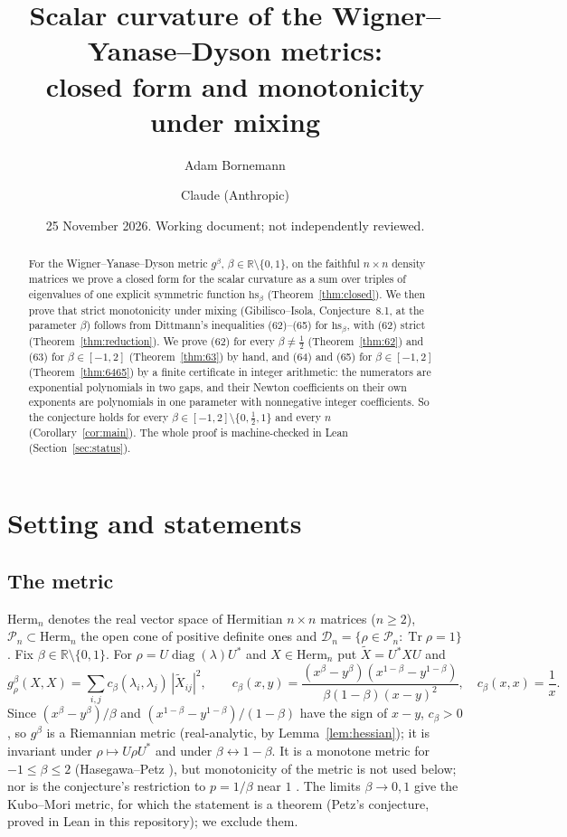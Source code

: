 \documentclass[11pt]{amsart}
\title[The WYD curvature conjecture]{Scalar curvature of the Wigner--Yanase--Dyson metrics:\\ closed form and monotonicity under mixing}
\author{Adam Bornemann}
\author{Claude (Anthropic)}
\date{25 November 2026. Working document; not independently reviewed.}
\theoremstyle{definition}
\numberwithin{equation}{section}
\newcommand{\R}{\mathbb{R}}
\newcommand{\Herm}{\mathrm{Herm}_n}
\newcommand{\Pn}{\mathcal{P}_n}
\newcommand{\Dn}{\mathcal{D}_n}
\newcommand{\Tr}{\operatorname{Tr}}
\newcommand{\hs}{\mathrm{hs}}
\begin{document}
\begin{abstract}
For the Wigner--Yanase--Dyson metric $g^\beta$, $\beta\in\R\setminus\{0,1\}$, on the faithful $n\times n$ density
matrices we prove a closed form for the scalar curvature as a sum over triples of eigenvalues of one explicit symmetric
function $\hs_\beta$ (Theorem~\ref{thm:closed}). We then prove that strict monotonicity under mixing
(Gibilisco--Isola, Conjecture~8.1, at the parameter $\beta$) follows from Dittmann's inequalities (62)--(65) for
$\hs_\beta$, with (62) strict (Theorem~\ref{thm:reduction}). We prove (62) for every $\beta\ne\frac12$ (Theorem~\ref{thm:62}) and (63) for $\beta\in[-1,2]$
(Theorem~\ref{thm:63}) by hand, and (64) and (65) for $\beta\in[-1,2]$ (Theorem~\ref{thm:6465}) by a finite certificate in integer arithmetic: the numerators are exponential polynomials in two gaps, and their
Newton coefficients on their own exponents are polynomials in one parameter with nonnegative integer coefficients. So the conjecture holds for every $\beta\in[-1,2]\setminus\{0,\frac12,1\}$ and every $n$
(Corollary~\ref{cor:main}). The whole proof is machine-checked in Lean (Section~\ref{sec:status}).
\end{abstract}

\maketitle

\section{Setting and statements}

\subsection*{The metric} $\Herm$ denotes the real vector space of Hermitian $n\times n$ matrices ($n\ge 2$), $\Pn\subset\Herm$ the
open cone of positive definite ones and $\Dn=\{\rho\in\Pn:\Tr\rho=1\}$. Fix $\beta\in\R\setminus\{0,1\}$. For $\rho=U\operatorname{diag}(\lambda)U^*$
and $X\in\Herm$ put $\tilde X=U^*XU$ and
\begin{equation}\label{eq:metric}
g^\beta_\rho(X,X)=\sum_{i,j}c_\beta(\lambda_i,\lambda_j)\,|\tilde X_{ij}|^2,\qquad
c_\beta(x,y)=\frac{(x^\beta-y^\beta)(x^{1-\beta}-y^{1-\beta})}{\beta(1-\beta)(x-y)^2},\quad c_\beta(x,x)=\frac1x .
\end{equation}
Since $(x^\beta-y^\beta)/\beta$ and $(x^{1-\beta}-y^{1-\beta})/(1-\beta)$ have the sign of $x-y$, $c_\beta>0$, so $g^\beta$ is a Riemannian
metric (real-analytic, by Lemma~\ref{lem:hessian}); it is invariant under $\rho\mapsto U\rho U^*$ and under $\beta\leftrightarrow1-\beta$.
It is a monotone metric for $-1\le\beta\le2$ (Hasegawa--Petz \cite{hp}), but monotonicity of the metric is not used
below; nor is the conjecture's restriction to $p=1/\beta$ near $1$ \cite{gi}. The limits $\beta\to0,1$ give the Kubo--Mori metric, for which the statement is a theorem (Petz's conjecture, proved in
Lean in this repository); we exclude them.
\end{document}
